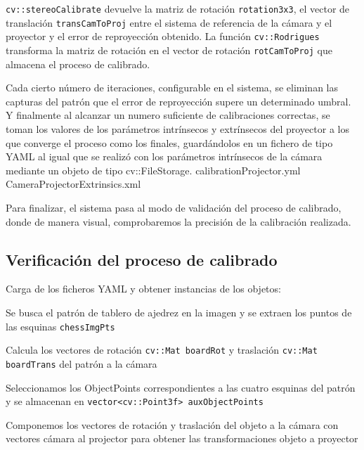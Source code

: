 \texttt{cv::stereoCalibrate} devuelve la matriz de rotación \texttt{rotation3x3}, el vector de translación \texttt{transCamToProj} entre el sistema de referencia de la cámara y el proyector y el error de reproyección obtenido. La función \texttt{cv::Rodrigues} transforma la matriz de rotación en el vector de rotación \texttt{rotCamToProj} que almacena el proceso de calibrado.

Cada cierto número de iteraciones, configurable en el sistema, se eliminan las capturas del patrón que el error de reproyección supere un determinado umbral. Y finalmente al alcanzar un numero suficiente de calibraciones correctas, se toman los valores de los parámetros intrínsecos y extrínsecos del proyector a los que converge el proceso como los finales, guardándolos en un fichero de tipo YAML al igual que se realizó con los parámetros intrínsecos de la cámara mediante un objeto de tipo cv::FileStorage. calibrationProjector.yml CameraProjectorExtrinsics.xml


Para finalizar, el sistema pasa al modo de validación del proceso de calibrado, donde de manera visual, comprobaremos la precisión de la calibración realizada.

\subsection{Verificación del proceso de calibrado}
Carga de los ficheros YAML y obtener instancias de los objetos:

Se busca el patrón de tablero de ajedrez en la imagen y se extraen los puntos de las esquinas \texttt{chessImgPts}

Calcula los vectores de rotación \texttt{cv::Mat boardRot} y traslación \texttt{cv::Mat boardTrans} del patrón a la cámara

Seleccionamos los ObjectPoints correspondientes a las cuatro esquinas del patrón y se almacenan en \texttt{vector<cv::Point3f> auxObjectPoints}


Componemos los vectores de rotación y traslación del objeto a la cámara con vectores cámara al projector para obtener las transformaciones objeto a proyector


